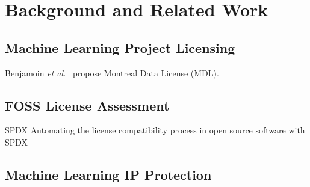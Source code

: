 \section{Background and Related Work}

\subsection{Machine Learning Project Licensing}

Benjamoin \textit{et al.}~\cite{benjamin2019towards} propose Montreal Data License (MDL).

\subsection{FOSS License Assessment}
SPDX
Automating the license compatibility process in open source software with SPDX

\subsection{Machine Learning IP Protection}
